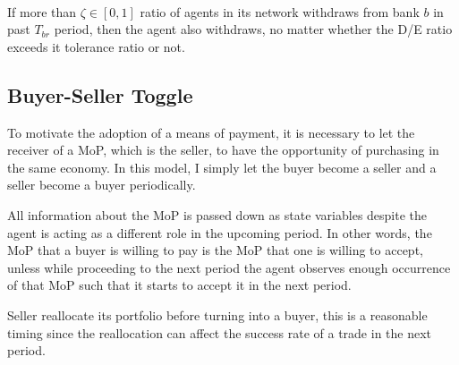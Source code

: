 \begin{definition}
   \phantom{text} \\
   If more than $\zeta \in [0,1]$ ratio of agents in its network withdraws from
   bank $b$ in past $T_{br}$ period, then the agent also withdraws, no matter
   whether the D/E ratio exceeds it tolerance ratio or not.

\end{definition}


\subsection{Buyer-Seller Toggle}
To motivate the adoption of a means of payment, it is necessary to let the
receiver of a MoP, which is the seller, to have the opportunity of purchasing in
the same economy. In this model, I simply let the buyer become a seller and a
seller become a buyer periodically.

All information about the MoP is passed down as state variables despite the
agent is acting as a different role in the upcoming period. In other words, the
MoP that a buyer is willing to pay is the MoP that one is willing to accept,
unless while proceeding to the next period the agent observes enough occurrence
of that MoP such that it starts to accept it in the next period.

Seller reallocate its portfolio before turning into a buyer, this is a
reasonable timing since the reallocation can affect the success rate of a trade
in the next period.